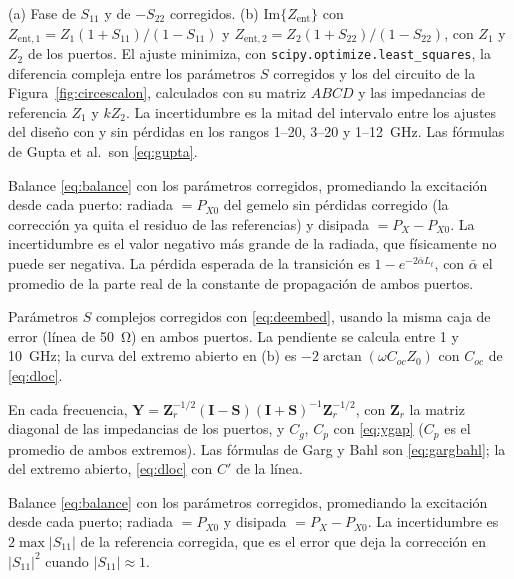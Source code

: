 \documentclass[11pt,letterpaper]{article}
\begin{document}
\begin{description}[style=nextline,leftmargin=0pt,itemsep=4pt,font=\normalfont\bfseries]
\item[Figura~\ref{fig:dfase} y Tabla~\ref{tab:dfit} (circuito del escalón)] (a) Fase de $S_{11}$ y de $-S_{22}$ corregidos. (b) $\mathrm{Im}\{Z_{\mathrm{ent}}\}$ con $Z_{\mathrm{ent},1}=Z_1(1+S_{11})/(1-S_{11})$ y $Z_{\mathrm{ent},2}=Z_2(1+S_{22})/(1-S_{22})$, con $Z_1$ y $Z_2$ de los puertos. El ajuste minimiza, con \texttt{scipy.optimize.least\_squares}, la diferencia compleja entre los parámetros $S$ corregidos y los del circuito de la Figura~\ref{fig:circescalon}, calculados con su matriz $ABCD$ y las impedancias de referencia $Z_1$ y $kZ_2$. La incertidumbre es la mitad del intervalo entre los ajustes del diseño con y sin pérdidas en los rangos 1--20, 3--20 y 1--\SI{12}{GHz}. Las fórmulas de Gupta et al.\ son \eqref{eq:gupta}.

\item[Figura~\ref{fig:dpot} y Tabla~\ref{tab:dpot} (potencia en el cambio de ancho)] Balance \eqref{eq:balance} con los parámetros corregidos, promediando la excitación desde cada puerto: radiada $=P_{X0}$ del gemelo sin pérdidas corregido (la corrección ya quita el residuo de las referencias) y disipada $=P_X-P_{X0}$. La incertidumbre es el valor negativo más grande de la radiada, que físicamente no puede ser negativa. La pérdida esperada de la transición es $1-e^{-2\bar\alpha L_t}$, con $\bar\alpha$ el promedio de la parte real de la constante de propagación de ambos puertos.

\item[Tabla~\ref{tab:d3sparam} y Figura~\ref{fig:d3s} (gap: parámetros $S$)] Parámetros $S$ complejos corregidos con \eqref{eq:deembed}, usando la misma caja de error (línea de \SI{50}{\ohm}) en ambos puertos. La pendiente se calcula entre 1 y \SI{10}{GHz}; la curva del extremo abierto en (b) es $-2\arctan(\omega C_{oc}Z_0)$ con $C_{oc}$ de \eqref{eq:dloc}.

\item[Figura~\ref{fig:d3cap} y Tabla~\ref{tab:d3circ} (gap: circuito $\pi$)] En cada frecuencia, $\mathbf{Y}=\mathbf{Z}_r^{-1/2}(\mathbf{I}-\mathbf{S})(\mathbf{I}+\mathbf{S})^{-1}\mathbf{Z}_r^{-1/2}$, con $\mathbf{Z}_r$ la matriz diagonal de las impedancias de los puertos, y $C_g$, $C_p$ con \eqref{eq:ygap} ($C_p$ es el promedio de ambos extremos). Las fórmulas de Garg y Bahl son \eqref{eq:gargbahl}; la del extremo abierto, \eqref{eq:dloc} con $C'$ de la línea.

\item[Figura~\ref{fig:d3pot} y Tabla~\ref{tab:d3pot} (gap: potencia)] Balance \eqref{eq:balance} con los parámetros corregidos, promediando la excitación desde cada puerto; radiada $=P_{X0}$ y disipada $=P_X-P_{X0}$. La incertidumbre es $2\max|S_{11}|$ de la referencia corregida, que es el error que deja la corrección en $|S_{11}|^2$ cuando $|S_{11}|\approx 1$.


\end{description}
\end{document}
